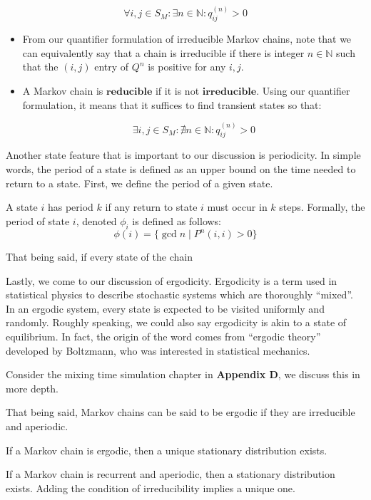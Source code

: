 $$\forall i,j \in S_M: \exists n \in \mathbb{N} : q_{ij}^{(n)} > 0$$
\begin{itemize}
\item From our quantifier formulation of irreducible Markov chains, note that we can equivalently say that a chain is irreducible if there is integer $n \in \mathbb{N}$ such that the $(i,j)$ entry of $Q^n$ is positive for any $i,j$.

\item A Markov chain is $\textbf{reducible}$ if it is not $\textbf{irreducible}$. Using our quantifier formulation, it means that it suffices to find transient states so that:

$$\exists i,j \in S_M: \nexists n \in \mathbb{N} : q_{ij}^{(n)} > 0$$
\end{itemize}

Another state feature that is important to our discussion is periodicity.
In simple words, the period of a state is defined as an upper bound on the time needed to return to a state.
First, we define the period of a given state.

\begin{definition}[Period]
A state $i$ has period $k$ if any return to state $i$ must occur in $k$ steps.
Formally, the period of state $i$, denoted $\phi_i$ is defined as follows:
$$\phi(i) = \{\gcd{n} \mid P^n(i,i) > 0\}$$
\end{definition}

That being said, if every state of the chain


Lastly, we come to our discussion of ergodicity. Ergodicity is a term used in statistical physics to describe stochastic systems which are thoroughly ``mixed''.
In an ergodic system, every state is expected to be visited uniformly and randomly. Roughly speaking, we could also say ergodicity is akin to a state of equilibrium.
In fact, the origin of the word comes from ``ergodic theory'' developed by Boltzmann, who was interested in statistical mechanics.

\begin{definition}[Ergodicity]
\end{definition}

Consider the mixing time simulation chapter in \textbf{Appendix D}, we discuss this in more depth.

That being said, Markov chains can be said to be ergodic if they are irreducible and aperiodic.

If a Markov chain is ergodic, then a unique stationary distribution exists.

If a Markov chain is recurrent and aperiodic, then a stationary distribution exists.
Adding the condition of irreducibility implies a unique one.

